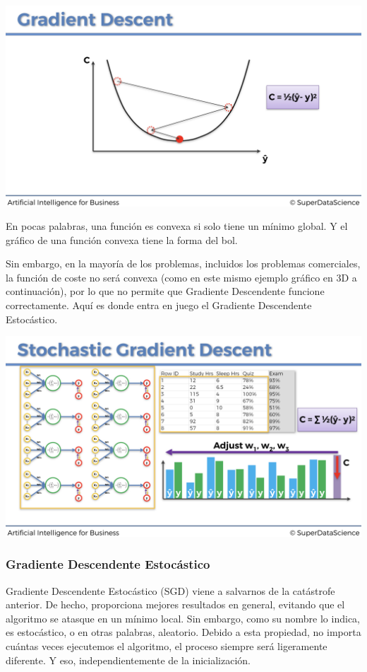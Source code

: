 \documentclass[]{book}
\begin{document}
\includegraphics{Images/ANN_23.png}

En pocas palabras, una función es convexa si solo tiene un mínimo global. Y el gráfico de una función convexa tiene la forma del bol.

Sin embargo, en la mayoría de los problemas, incluidos los problemas comerciales, la función de coste no será convexa (como en este mismo ejemplo gráfico en 3D a continuación), por lo que no permite que Gradiente Descendente funcione correctamente. Aquí es donde entra en juego el Gradiente Descendente Estocástico.

\includegraphics{Images/ANN_26.png}

\hypertarget{gradiente-descendente-estocuxe1stico}{%
\subsubsection{Gradiente Descendente Estocástico}\label{gradiente-descendente-estocuxe1stico}}

Gradiente Descendente Estocástico (SGD) viene a salvarnos de la catástrofe anterior. De hecho, proporciona mejores resultados en general, evitando que el algoritmo se atasque en un mínimo local. Sin embargo, como su nombre lo indica, es estocástico, o en otras palabras, aleatorio. Debido a esta propiedad, no importa cuántas veces ejecutemos el algoritmo, el proceso siempre será ligeramente diferente. Y eso, independientemente de la inicialización.
\end{document}
